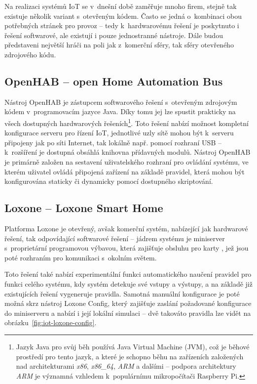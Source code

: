 Na realizaci systémů IoT se v~dnešní době zaměřuje mnoho firem, stejně tak existuje několik variant s~otevřeným kódem.
Často se jedná o~kombinaci obou potřebných stránek pro provoz -- tedy k~hardwarovému řešení je poskytnuto i řešení
softwarové, ale existují i pouze jednostranné nástroje.
Dále budou představeni největší hráči na poli jak z~komerční sféry, tak sféry otevřeného zdrojového kódu.

\subsection{OpenHAB -- open Home Automation Bus}\label{subsec:openhab}
Nástroj OpenHAB je zástupcem softwarového řešení s~otevřeným zdrojovým kódem v~programovacím jazyce Java.
Díky tomu jej lze spustit prakticky na všech dostupných hardwarových řešeních\footnote{Jazyk Java pro svůj běh
používá Java Virtual Machine (JVM), což je běhové prostředí pro tento jazyk, a které je schopno běhu na zařízeních
založených nad architekturami \textit{x86}, \textit{x86\_64}, \textit{ARM} a dalšími -- podpora architektury
\textit{ARM} je významná vzhledem k~populárnímu mikropočítači Raspberry Pi.}.
Toto řešení nabízí možnost kompletní konfigurace serveru pro řízení IoT, jednotlivé uzly sítě mohou být k~serveru
připojeny jak po síti Internet, tak lokálně např. pomocí rozhraní USB -- k~rozšíření je dostupná obsáhlá
knihovna přídavných modulů.
Nástroj OpenHAB je primárně založen na sestavení uživatelského rozhraní pro ovládání systému, ve kterém uživatel ovládá
připojená zařízení na základě pravidel, která mohou být konfigurována staticky či dynamicky pomocí dostupného
skriptování.

\subsection{Loxone -- Loxone Smart Home}\label{subsec:loxone}
Platforma Loxone je otevřený, avšak komerční systém, nabízející jak hardwarové řešení, tak odpovídající softwarové
řešení --
jádrem systému je miniserver s~proprietární programovou výbavou, která zajišťuje obsluhu pro karty , jež jsou poté rozhraním pro komunikaci s~okolním světem.

Toto řešení také nabízí experimentální funkci automatického naučení pravidel pro funkci celého systému, kdy
systém detekuje své vstupy a výstupy, a na základě již existujících řešení vygeneruje pravidla.
Samotná manuální konfigurace je poté možná skrz nástroj Loxone Config, který zajišťuje zaslání požadované
konfigurace do miniserveru a nabízí i její lokální simulaci -- dvě takováto pravidla lze vidět na
obrázku~\ref{fig:iot-loxone-config}.

